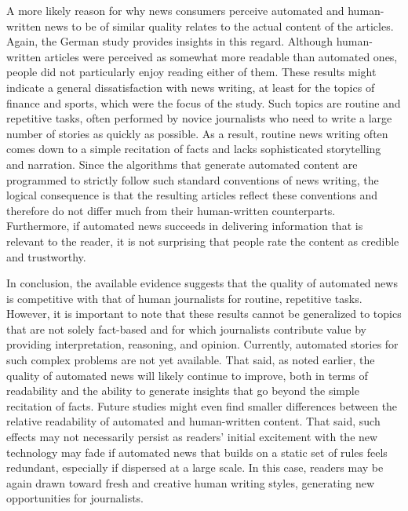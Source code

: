 \documentclass[notoc, symmetric, nobib, nols]{towcenter-guideto-book}
\begin{document}
A more likely reason for why news consumers perceive automated and human-written news to be of similar quality relates to the actual content of the articles. Again, the German study provides insights in this regard.\autocite{graefe15} Although human-written articles were perceived as somewhat more readable than automated ones, people did not particularly enjoy reading either of them. These results might indicate a general dissatisfaction with news writing, at least for the topics of finance and sports, which were the focus of the study. Such topics are routine and repetitive tasks, often performed by novice journalists who need to write a large number of stories as quickly as possible. As a result, routine news writing often comes down to a simple recitation of facts and lacks sophisticated storytelling and narration. Since the algorithms that generate automated content are programmed to strictly follow such standard conventions of news writing, the logical consequence is that the resulting articles reflect these conventions and therefore do not differ much from their human-written counterparts. Furthermore, if automated news succeeds in delivering information that is relevant to the reader, it is not surprising that people rate the content as credible and trustworthy.

In conclusion, the available evidence suggests that the quality of automated news is competitive with that of human journalists for routine, repetitive tasks. However, it is important to note that these results cannot be generalized to topics that are not solely fact-based and for which journalists contribute value by providing interpretation, reasoning, and opinion. Currently, automated stories for such complex problems are not yet available. That said, as noted earlier, the quality of automated news will likely continue to improve, both in terms of readability and the ability to generate insights that go beyond the simple recitation of facts. Future studies might even find smaller differences between the relative readability of automated and human-written content. That said, such effects may not necessarily persist as readers' initial excitement with the new technology may fade if automated news that builds on a static set of rules feels redundant, especially if dispersed at a large scale. In this case, readers may be again drawn toward fresh and creative human writing styles, generating new opportunities for journalists. 
\end{document}
